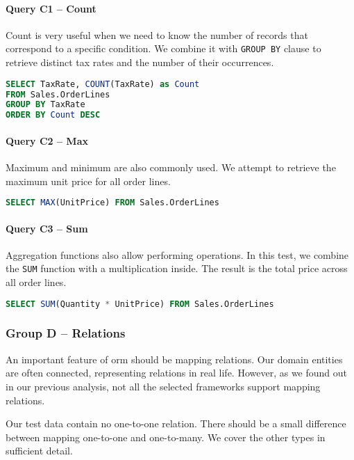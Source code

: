 \paragraph{Query C1 -- Count}
\label{query:c1}
Count is very useful when we need to know the number of records that correspond to a specific condition. We combine it with \texttt{GROUP BY} clause to retrieve distinct tax rates and the number of their occurrences.

\begin{lstlisting}[language=SQL]
SELECT TaxRate, COUNT(TaxRate) as Count 
FROM Sales.OrderLines 
GROUP BY TaxRate 
ORDER BY Count DESC
\end{lstlisting}

\paragraph{Query C2 -- Max}
\label{query:c2}
Maximum and minimum are also commonly used. We attempt to retrieve the maximum unit price for all order lines.

\begin{lstlisting}[language=SQL]
SELECT MAX(UnitPrice) FROM Sales.OrderLines
\end{lstlisting}

\paragraph{Query C3 -- Sum}
\label{query:c3}
Aggregation functions also allow performing operations. In this test, we combine the \texttt{SUM} function with a multiplication inside. The result is the total price across all order lines.

\begin{lstlisting}[language=SQL]
SELECT SUM(Quantity * UnitPrice) FROM Sales.OrderLines
\end{lstlisting}

\subsubsection{Group D -- Relations}
An important feature of \acrshort{orm} should be mapping relations. Our domain entities are often connected, representing relations in real life.
However, as we found out in our previous analysis, not all the selected frameworks support mapping relations. 

Our test data contain no one-to-one relation. There should be a small difference between mapping one-to-one and one-to-many. We cover the other types in sufficient detail.

